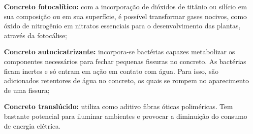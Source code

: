 \begin{alineas}
    \item \textbf{Concreto fotocalítico:} com a incorporação de dióxidos de titânio ou silício em sua composição ou em sua superfície, é possível transformar gases nocivos, como óxido de nitrogênio em nitratos essenciais para o desenvolvimento das plantas, através da fotocálise;
    
    \item \textbf{Concreto autocicatrizante:} incorpora-se bactérias capazes metabolizar os componentes necessários para fechar pequenas fissuras no concreto. As bactérias ficam inertes e só entram em ação em contato com água. Para isso, são adicionados retentores de água no concreto, os quais se rompem no aparecimento de uma fissura;
    
    \item \textbf{Concreto translúcido:} utiliza como aditivo fibras óticas poliméricas. Tem bastante potencial para iluminar ambientes e provocar a diminuição do consumo de energia elétrica.
    
\end{alineas}
